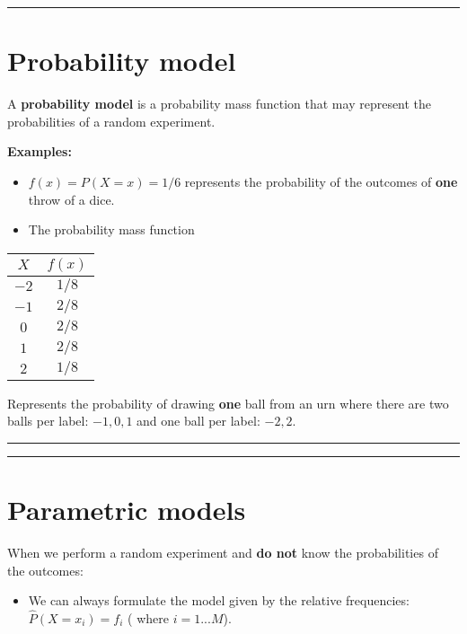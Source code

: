 \documentclass[
]{book}
\providecommand{\tightlist}{%
  \setlength{\itemsep}{0pt}\setlength{\parskip}{0pt}}
\begin{document}
\begin{center}\rule{0.5\linewidth}{0.5pt}\end{center}

\hypertarget{probability-model}{%
\section{Probability model}\label{probability-model}}

A \textbf{probability model} is a probability mass function that may represent the probabilities of a random experiment.

\textbf{Examples:}

\begin{itemize}
\item
  \(f(x)=P(X=x)=1/6\) represents the probability of the outcomes of \textbf{one} throw of a dice.
\item
  The probability mass function
\end{itemize}

\begin{longtable}[]{@{}cc@{}}
\toprule
\(X\) & \(f(x)\) \\
\midrule
\endhead
\(-2\) & \(1/8\) \\
\(-1\) & \(2/8\) \\
\(0\) & \(2/8\) \\
\(1\) & \(2/8\) \\
\(2\) & \(1/8\) \\
\bottomrule
\end{longtable}

Represents the probability of drawing \textbf{one} ball from an urn where there are two balls per label: \(-1, 0, 1\) and one ball per label: \(-2, 2\).

\begin{center}\rule{0.5\linewidth}{0.5pt}\end{center}

\begin{center}\rule{0.5\linewidth}{0.5pt}\end{center}

\hypertarget{parametric-models}{%
\section{Parametric models}\label{parametric-models}}

When we perform a random experiment and \textbf{do not} know the probabilities of the outcomes:

\begin{itemize}
\tightlist
\item
  We can always formulate the model given by the relative frequencies: \(\hat{P}(X=x_i)=f_i\) ( where \(i=1...M\)).
\end{itemize}
\end{document}
